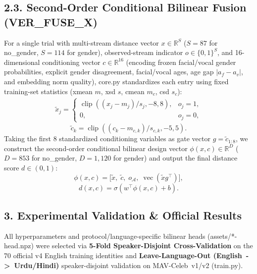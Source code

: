 \documentclass[10pt,letterpaper]{article}
\begin{document}
\balance\subsection*{\texorpdfstring{2.3. Second-Order Conditional Bilinear Fusion (\textnormal{VER\_\allowbreak{}FUSE\_\allowbreak{}X})}{2.3. Second-Order Conditional Bilinear Fusion (VER\_\allowbreak{}FUSE\_\allowbreak{}X)}}\label{second-order-conditional-bilinear-fusion-ver_fuse_x}

For a single trial with multi-stream distance vector \(x \in \mathbb{R}^{S}\) (\(S=87\) for \textnormal{no\_\allowbreak{}gender}, \(S=114\) for \textnormal{gender}), observed-stream indicator \(o \in \{0,1\}^S\), and 16-dimensional conditioning vector \(c \in \mathbb{R}^{16}\) (encoding frozen facial/vocal gender probabilities, explicit gender disagreement, facial/vocal ages, age gap \(|a_f - a_v|\), and embedding norm quality), \textnormal{core.py} standardizes each entry using fixed training-set statistics (\textnormal{xmean} \(m\), \textnormal{xsd} \(s\), \textnormal{cmean} \(m_c\), \textnormal{csd} \(s_c\)): \[\begin{aligned}\tilde{x}_j = \begin{cases} \operatorname{clip}((x_j - m_j)/s_j, -8, 8), & o_j = 1, \\ 0, & o_j = 0, \end{cases} \end{aligned}\] \[\tilde{c}_k = \operatorname{clip}((c_k - m_{c,k})/s_{c,k}, -5, 5).\] Taking the first 8 standardized conditioning variables as gate vector \(g = \tilde{c}_{1:8}\), we construct the second-order conditional bilinear design vector \(\phi(x, c) \in \mathbb{R}^{D}\) (\(D=853\) for \textnormal{no\_\allowbreak{}gender}, \(D=1,120\) for \textnormal{gender}) and output the final distance score \(d \in (0,1)\): \[\phi(x, c) = \big[\tilde{x},\; \tilde{c},\; o_{\mathcal{A}},\; \operatorname{vec}(\tilde{x} g^\top)\big], \] \[d(x, c) = \sigma(w^\top \phi(x, c) + b).\]

\subsection*{3. Experimental Validation \& Official Results}\label{experimental-validation-official-results}

All hyperparameters and protocol/language-specific bilinear heads (\textnormal{assets/*-head.npz}) were selected via \textbf{5-Fold Speaker-Disjoint Cross-Validation} on the 70 official \textnormal{v4} English training identities and \textbf{Leave-Language-Out (\textnormal{English\ -\textgreater{}\ Urdu/Hindi})} speaker-disjoint validation on \textnormal{MAV-Celeb\ v1/v2} (\textnormal{train.py}).
\end{document}

